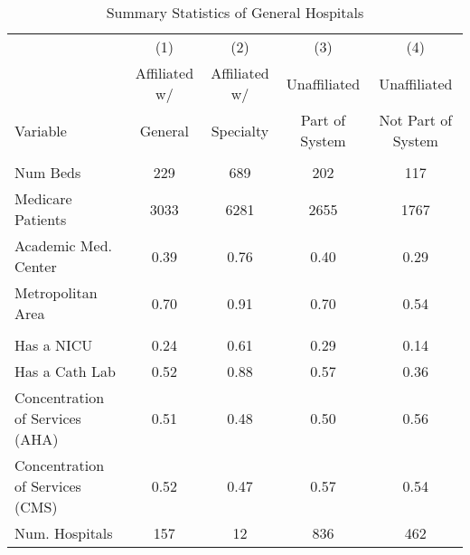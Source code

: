 \begin{table}[ht!]

\caption{Summary Statistics of General Hospitals\label{tab:hospital_general_summarystats}}
\centering
\begin{tabular}[t]{lcccc}
\toprule
 & (1) & (2) & (3) & (4)\\
 & Affiliated w/ & Affiliated w/ & Unaffiliated & Unaffiliated\\
Variable & General & Specialty & Part of System & Not Part of System\\
\midrule
\addlinespace[0.3em]
\multicolumn{5}{l}{\textbf{Characteristics}}\\
\hspace{1em}Num Beds & 229 & 689 & 202 & 117\\
\hspace{1em}Medicare Patients & 3033 & 6281 & 2655 & 1767\\
\hspace{1em}Academic Med. Center & 0.39 & 0.76 & 0.40 & 0.29\\
\hspace{1em}Metropolitan Area & 0.70 & 0.91 & 0.70 & 0.54\\
\addlinespace[0.3em]
\multicolumn{5}{l}{\textbf{Services}}\\
\hspace{1em}Has a NICU & 0.24 & 0.61 & 0.29 & 0.14\\
\hspace{1em}Has a Cath Lab & 0.52 & 0.88 & 0.57 & 0.36\\
\hspace{1em}Concentration of Services (AHA) & 0.51 & 0.48 & 0.50 & 0.56\\
\hspace{1em}Concentration of Services (CMS) & 0.52 & 0.47 & 0.57 & 0.54\\
\addlinespace[0.3em]
Num. Hospitals & 157 & 12 & 836 & 462\\
\bottomrule
\end{tabular}
\end{table}